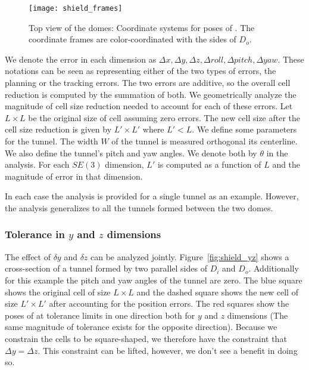 \documentclass[a4paper]{report}
\begin{document}
\begin{figure}[ht]
\centering
 \texttt{[image: shield\_frames]}
\caption{Top view of the domes: Coordinate systems for poses of \calS. The coordinate frames are color-coordinated with the sides of $D_o$.}
\label{fig:shield_frames}
\end{figure}

We denote the error in each dimension as $\Delta x, \Delta y, \Delta z, \Delta roll, \Delta pitch, \Delta yaw$. These notations can be seen as representing either of the two types of errors, the planning or the tracking errors. The two errors are additive, so the overall cell reduction is computed by the summation of both.
%
We geometrically analyze the magnitude of cell size reduction needed to account for each of these errors. Let $L \times L$ be the original size of cell assuming zero errors. The new cell size after the cell size reduction is given by $L' \times L'$ where $L' < L$.
%
We define some parameters for the tunnel. The width $W$ of the tunnel is measured orthogonal its centerline. We also define the tunnel's pitch and yaw angles. We denote both by $\theta$ in the analysis.
%
For each $SE(3)$ dimension, $L'$ is computed as a function of $L$ and the magnitude of error in that dimension.

In each case the analysis is provided for a single tunnel as an example. However, the analysis generalizes to all the tunnels formed between the two domes.
%

\subsubsection{Tolerance in $y$ and $z$ dimensions}
The effect of $\delta y$ and $\delta z$ can be analyzed jointly. Figure~\ref{fig:shield_yz} shows a cross-section of a tunnel formed by two parallel sides of $D_i$ and $D_o$. Additionally for this example the pitch and yaw angles of the tunnel are zero. The blue square shows the original cell of size $L \times L$ and the dashed square shows the new cell of size $L' \times L'$ after accounting for the position errors. The red squares show the poses of \calS at tolerance limits in one direction both for $y$ and $z$ dimensions (The same magnitude of tolerance exists for the opposite direction). Because we constrain the cells to be square-shaped, we therefore have the constraint that $\Delta y = \Delta z$. This constraint can be lifted, however, we don't see a benefit in doing so.
\end{document}
